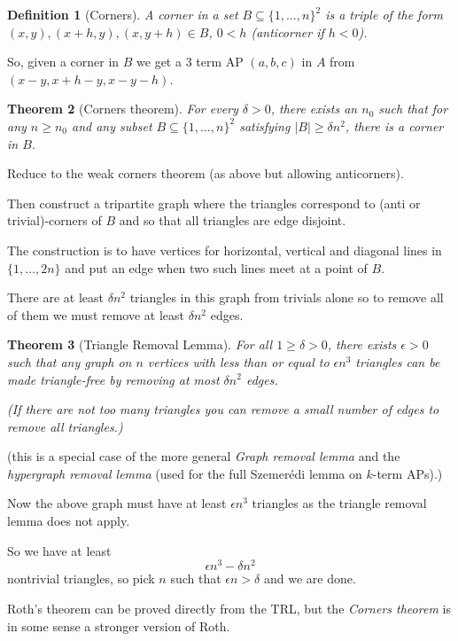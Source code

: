 \documentclass[oneside,12pt,]{article}
\newtheorem{theorem}{Theorem}
\newtheorem{definition}[theorem]{Definition}
\begin{document}
\begin{definition}[Corners] A \emph{corner} in a set $B \subseteq \{1, \ldots, n\}^2$ is a triple of the form $(x,y), (x+h, y), (x, y+h) \in B$, $0 < h$ (anticorner if $h < 0$).
\end{definition}
So, given a corner in $B$ we get a 3 term AP $(a,b,c)$ in $A$ from $(x-y, x+h-y, x - y - h)$.

\begin{theorem}[Corners theorem] For every $\delta>0$, there exists an $n_0$ such that for any $n \geq n_0$ and any subset $B \subseteq\{1, \ldots, n\}^2$ satisfying $|B| \geq \delta n^2$, there is a corner in $B$.
\end{theorem}

Reduce to the weak corners theorem (as above but allowing anticorners).

Then construct a tripartite graph where the triangles correspond to (anti or trivial)-corners of $B$ and so that all triangles are edge disjoint.

The construction is to have vertices for horizontal, vertical and diagonal lines in $\{1, \ldots, 2n\}$ and put an edge when two such lines meet at a point of $B$.

There are at least $\delta n^2$ triangles in this graph from trivials alone so to remove all of them we must remove at least $\delta n^2$ edges.


\begin{theorem}[Triangle Removal Lemma] For all $1\ge \delta >0$, there exists $\epsilon >0$ such that any graph on $n$ vertices with less than or equal to $\epsilon  n^3$ triangles can be made triangle-free by removing at most $\delta  n^2$ edges.

    (If there are not too many triangles you can remove a small number of edges to remove all triangles.)
\end{theorem}

(this is a special case of the more general \emph{Graph removal lemma} and the \emph{hypergraph removal lemma} (used for the full Szemerédi lemma on $k$-term APs).)

Now the above graph must have at least $\epsilon n^3$ triangles as the triangle removal lemma does not apply.

So we have at least
$$\epsilon   n^3 - \delta n^2$$
nontrivial triangles, so pick $n$ such that $\epsilon n > \delta $ and we are done.


Roth's theorem can be proved directly from the TRL, but the \emph{Corners theorem} is in some sense a stronger version of Roth.
\end{document}
